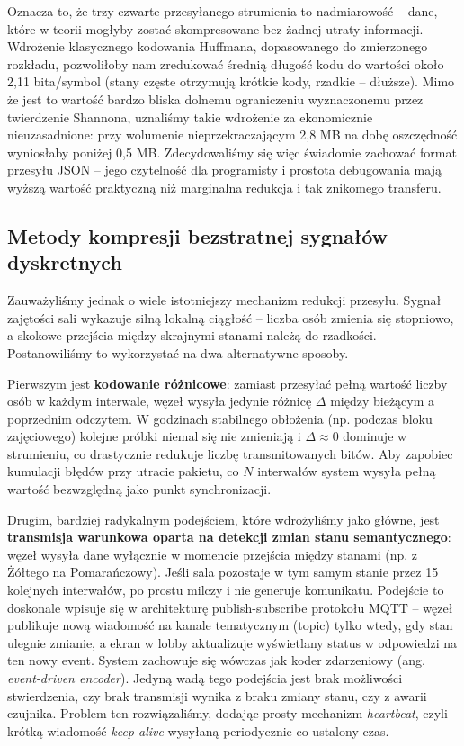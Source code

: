 \documentclass[14pt,a4paper]{extarticle}
\begin{document}
Oznacza to, że trzy czwarte przesyłanego strumienia to nadmiarowość – dane, które w teorii mogłyby zostać skompresowane bez żadnej utraty informacji. Wdrożenie klasycznego kodowania Huffmana, dopasowanego do zmierzonego rozkładu, pozwoliłoby nam zredukować średnią długość kodu do wartości około 2,11 bita/symbol (stany częste otrzymują krótkie kody, rzadkie – dłuższe). Mimo że jest to wartość bardzo bliska dolnemu ograniczeniu wyznaczonemu przez twierdzenie Shannona, uznaliśmy takie wdrożenie za ekonomicznie nieuzasadnione: przy wolumenie nieprzekraczającym 2,8 MB na dobę oszczędność wyniosłaby poniżej 0,5 MB. Zdecydowaliśmy się więc świadomie zachować format przesyłu JSON – jego czytelność dla programisty i prostota debugowania mają wyższą wartość praktyczną niż marginalna redukcja i tak znikomego transferu.

\subsection{Metody kompresji bezstratnej sygnałów dyskretnych}
Zauważyliśmy jednak o wiele istotniejszy mechanizm redukcji przesyłu. Sygnał zajętości sali wykazuje silną lokalną ciągłość – liczba osób zmienia się stopniowo, a skokowe przejścia między skrajnymi stanami należą do rzadkości. Postanowiliśmy to wykorzystać na dwa alternatywne sposoby.

Pierwszym jest \textbf{kodowanie różnicowe}: zamiast przesyłać pełną wartość liczby osób w każdym interwale, węzeł wysyła jedynie różnicę $\Delta$ między bieżącym a poprzednim odczytem. W godzinach stabilnego obłożenia (np. podczas bloku zajęciowego) kolejne próbki niemal się nie zmieniają i $\Delta \approx 0$ dominuje w strumieniu, co drastycznie redukuje liczbę transmitowanych bitów. Aby zapobiec kumulacji błędów przy utracie pakietu, co $N$ interwałów system wysyła pełną wartość bezwzględną jako punkt synchronizacji.

Drugim, bardziej radykalnym podejściem, które wdrożyliśmy jako główne, jest \textbf{transmisja warunkowa oparta na detekcji zmian stanu semantycznego}: węzeł wysyła dane wyłącznie w momencie przejścia między stanami (np. z Żółtego na Pomarańczowy). Jeśli sala pozostaje w tym samym stanie przez 15 kolejnych interwałów, po prostu milczy i nie generuje komunikatu. Podejście to doskonale wpisuje się w architekturę publish-subscribe protokołu MQTT – węzeł publikuje nową wiadomość na kanale tematycznym (topic) tylko wtedy, gdy stan ulegnie zmianie, a ekran w lobby aktualizuje wyświetlany status w odpowiedzi na ten nowy event. System zachowuje się wówczas jak koder zdarzeniowy (ang. \textit{event-driven encoder}). Jedyną wadą tego podejścia jest brak możliwości stwierdzenia, czy brak transmisji wynika z braku zmiany stanu, czy z awarii czujnika. Problem ten rozwiązaliśmy, dodając prosty mechanizm \textit{heartbeat}, czyli krótką wiadomość \textit{keep-alive} wysyłaną periodycznie co ustalony czas.
\end{document}

